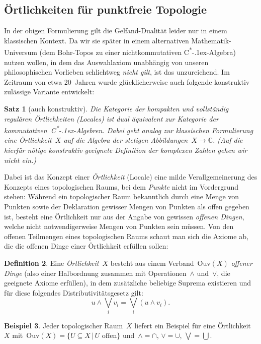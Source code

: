 \documentclass[a4paper,ngerman,12pt]{scrartcl}
\theoremstyle{definition}
\newtheorem{defn}{Definition}[section]
\newtheorem{bsp}[defn]{Beispiel}
\theoremstyle{plain}
\newtheorem{satz}[defn]{Satz}
\theoremstyle{remark}
\newcommand{\CC}{\mathbb{C}}
\newcommand{\Ouv}{\mathrm{Ouv}}
\newcommand{\csalgebra}{C\textsuperscript{*}\kern-.1ex-Algebra}
\newcommand{\csalgebren}{C\textsuperscript{*}\kern-.1ex-Alge\-bren}
\renewcommand{\_}{\mathpunct{.}\,}
\newcommand{\?}{\,{:}\,}
\begin{document}
\subsection{Örtlichkeiten für punktfreie Topologie}

In der obigen Formulierung gilt die Gelfand-Dualität leider nur in einem
klassischen Kontext. Da wir sie später in einem alternativen
Mathematik-Universum (dem Bohr-Topos zu einer nichtkommutativen \csalgebra)
nutzen wollen, in dem das Auswahlaxiom unabhängig von unseren philosophischen
Vorlieben schlichtweg \emph{nicht gilt}, ist das unzureichend. Im Zeitraum von
etwa 20~Jahren wurde glücklicherweise auch folgende konstruktiv zulässige Variante
entwickelt:

\begin{satz}[auch konstruktiv]Die Kategorie der kompakten und vollständig
regulären Örtlichkeiten (Locales) ist dual äquivalent zur Kategorie der
kommutativen~\csalgebren. Dabei geht analog zur klassischen Formulierung eine
Örtlichkeit~$X$ auf die Algebra der stetigen Abbildungen~$X \to \CC$.
(Auf die hierfür nötige konstruktiv geeignete Definition der komplexen Zahlen
gehen wir nicht ein.)
\end{satz}

Dabei ist das Konzept einer \emph{Örtlichkeit} (Locale) eine milde
Verallgemeinerung des Konzepts eines topologischen Raums, bei dem \emph{Punkte}
nicht im Vordergrund stehen: Während ein topologischer Raum bekanntlich durch
eine Menge von Punkten sowie der Deklaration gewisser Mengen von Punkten als
offen gegeben ist, besteht eine Örtlichkeit nur aus der Angabe von
gewissen \emph{offenen Dingen}, welche nicht notwendigerweise Mengen von
Punkten sein müssen. Von den offenen Teilmengen eines topologischen Raums
schaut man sich die Axiome ab, die die offenen Dinge einer Örtlichkeit
erfüllen sollen:

\begin{defn}Eine \emph{Örtlichkeit}~$X$ besteht aus einem Verband~$\Ouv(X)$
\emph{offener Dinge} (also einer Halbordnung zusammen mit Operationen~$\wedge$
und~$\vee$, die geeignete Axiome erfüllen), in dem zusätzliche beliebige
Suprema existieren und für diese folgendes Distributivitätsgesetz gilt:
\[ u \wedge \bigvee_i v_i = \bigvee_i (u \wedge v_i). \]
\end{defn}

\begin{bsp}
Jeder topologischer Raum~$X$ liefert ein Beispiel für eine Örtlichkeit~$X$
mit~$\Ouv(X) = \{ U \subseteq X \,|\, \text{$U$ offen} \}$ und~$\wedge =
\cap$, $\vee = \cup$, $\bigvee = \bigcup$.\end{bsp}
\end{document}
